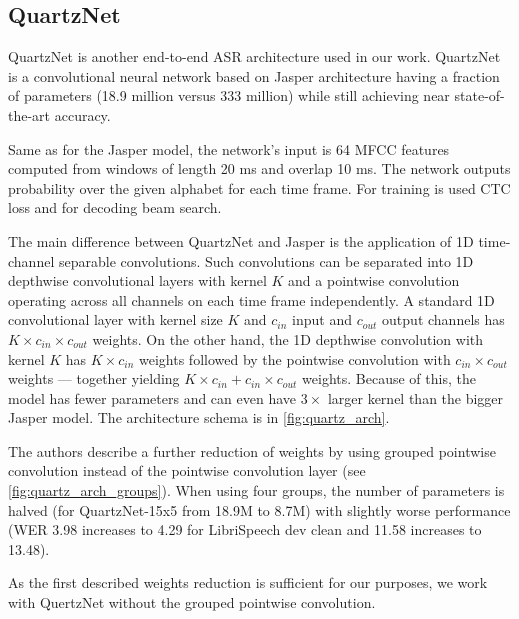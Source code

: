 \subsection{QuartzNet}
\label{intro:quartznet}

QuartzNet  is another end-to-end ASR architecture used in our work. QuartzNet is a convolutional neural network based on Jasper  architecture having a fraction of parameters (18.9 million versus 333 million) while still achieving near state-of-the-art accuracy.

Same as for the Jasper model, the network's input is 64 MFCC features computed from windows of length 20 ms and overlap 10 ms. The network outputs probability over the given alphabet for each time frame. For training is used CTC loss and for decoding beam search.

The main difference between QuartzNet and Jasper is the application of 1D time-channel separable convolutions.  Such convolutions can be separated into 1D depthwise convolutional layers with kernel $K$ and a pointwise convolution operating across all channels on each time frame independently. A standard 1D convolutional layer with kernel size $K$ and $c_{in}$ input and $c_{out}$ output channels has $K \times c_{in} \times c_{out}$ weights. On the other hand, the 1D depthwise convolution with kernel $K$ has $K \times c_{in}$ weights followed by the pointwise convolution with $c_{in} \times c_{out}$ weights --- together yielding $K \times c_{in} + c_{in} \times c_{out}$ weights. Because of this, the model has fewer parameters and can even have $3 \times$ larger kernel than the bigger Jasper model. The architecture schema is in \cref{fig:quartz_arch}.

The authors describe a further reduction of weights by using grouped pointwise convolution instead of the pointwise convolution layer (see  \cref{fig:quartz_arch_groups}). When using four groups, the number of parameters is halved (for QuartzNet-15x5 from 18.9M to 8.7M) with slightly worse performance (WER 3.98 increases to 4.29 for LibriSpeech dev clean and 11.58 increases to 13.48).

As the first described weights reduction is sufficient for our purposes, we work with QuertzNet without the grouped pointwise convolution.

